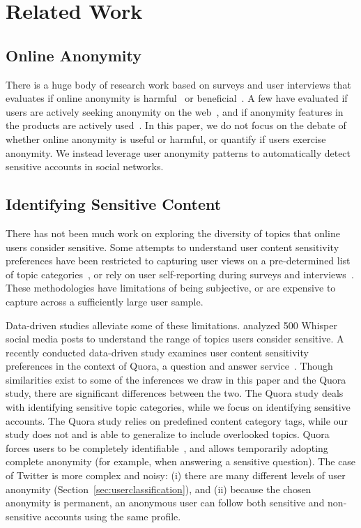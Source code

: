 \documentclass[conference]{IEEEtran}
\begin{document}
\section{Related Work}
\label{sec:twittersensitiverelatedwork}

\subsection{Online Anonymity}


There is a huge body of research work based on surveys and user interviews that evaluates if online anonymity is harmful~\cite{LelkesJDCB2012,Millen2003} or beneficial~\cite{Joinson1999,PostmesSSd2001,ConnollyJV1990}.
A few have evaluated if users are actively seeking anonymity on the web~\cite{KangBK2013}, and if
anonymity features in the products are actively used~\cite{fourchan,PeddintiCOSN2014,Gomez2008}. 
In this paper, we do not focus on the debate of whether online anonymity is useful or harmful, or quantify if users exercise anonymity. 
We instead leverage user anonymity patterns to automatically detect sensitive accounts in social networks. 


\subsection{Identifying Sensitive Content}

There has not been much work on exploring the diversity of topics that online users consider sensitive.  
Some attempts to understand user content sensitivity preferences have been restricted to capturing user views on a pre-determined list of topic categories~\cite{pewresearchsensitivity,hawkey2006examining,correa2015whisper}, or rely on user self-reporting during surveys and interviews~\cite{WangNKALC2011}. These methodologies have limitations of being subjective, or are expensive to capture across a sufficiently large user sample. 

Data-driven studies alleviate some of these limitations. 
\cite{correa2015whisper} analyzed 500 Whisper social media posts to understand the range of topics users consider sensitive.
A recently conducted data-driven study examines user content sensitivity preferences in the context of Quora, a question and answer service~\cite{Peddinti2014}. 
Though similarities exist to some of the inferences we draw in this paper and the Quora study, there are significant differences between the two. The Quora study deals with identifying sensitive topic categories, while we focus on identifying sensitive accounts. The Quora study relies on predefined content category tags,
while our study does not and is able to generalize to include overlooked topics.
Quora forces users to be completely identifiable~\cite{quorarealname}, and allows temporarily adopting complete anonymity (for example, when answering a sensitive question). The case of Twitter is more complex and noisy: (i) there are many different levels of user anonymity (Section~\ref{sec:userclassification}), and (ii) because the chosen anonymity is permanent, an anonymous user can follow both sensitive and non-sensitive accounts using the same profile. 
\end{document}
